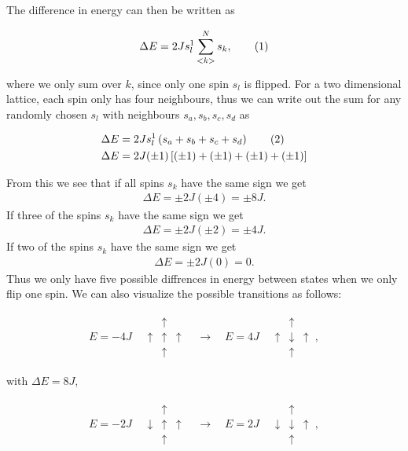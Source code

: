 \documentclass[reprint,english,notitlepage]{revtex4-1}  %
\newcommand\numberthis{\addtocounter{equation}{1}\tag{\theequation}}
\begin{document}
The difference in energy can then be written as

\begin{align*}
 	\Delta E = 2Js_{l}^{1} \sum_{<k>}^{N} s_{k}, \numberthis \label{eq:delta_e}
\end{align*}

where we only sum over \(k\), since only one spin \(s_{l}\) is flipped.
For a two dimensional lattice, each spin only has four neighbours, thus we can write out the sum for any randomly chosen \(s_{l}\) with neighbours \(s_{a}, s_{b}, s_{c}, s_{d}\) as

\begin{align*}
	\Delta E &= 2Js_{l}^{1}\left(s_{a} + s_{b} + s_{c} + s_{d}\right) \numberthis \label{eq:singleflip_energy_change} \\
	\Delta E &= 2J(\pm 1)\left[(\pm 1) + (\pm 1) + (\pm 1) + (\pm 1)\right]
\end{align*}

From this we see that if all spins \(s_{k}\) have the same sign we get
\begin{align*}
	\Delta E = \pm 2J(\pm 4) = \pm 8J.
\end{align*}
If three of the spins \(s_{k}\) have the same sign we get
\begin{align*}
	\Delta E = \pm 2J(\pm 2) = \pm 4J.
\end{align*}
If two of the spins \(s_{k}\) have the same sign we get
\begin{align*}
	\Delta E = \pm 2J(0) = 0.
\end{align*}
Thus we only have five possible diffrences in energy between states when we only flip one spin. We can also visualize the possible transitions as follows:

\begin{align*}
E = -4J \quad \begin{array}{ccc}
& \uparrow & \\
\uparrow & \uparrow & \uparrow \\
& \uparrow &
\end{array} \quad \to \quad E = 4J \quad \begin{array}{ccc}
& \uparrow & \\
\uparrow & \downarrow & \uparrow \\
& \uparrow &
\end{array} \, ,
\end{align*}

with $\Delta E = 8J$, 

\begin{align*}
E = -2J \quad \begin{array}{ccc}
& \uparrow & \\
\downarrow & \uparrow & \uparrow \\
& \uparrow &
\end{array} \quad \to \quad E = 2J \quad \begin{array}{ccc}
& \uparrow & \\
\downarrow & \downarrow & \uparrow \\
& \uparrow &
\end{array} \, ,
\end{align*}
\end{document}
